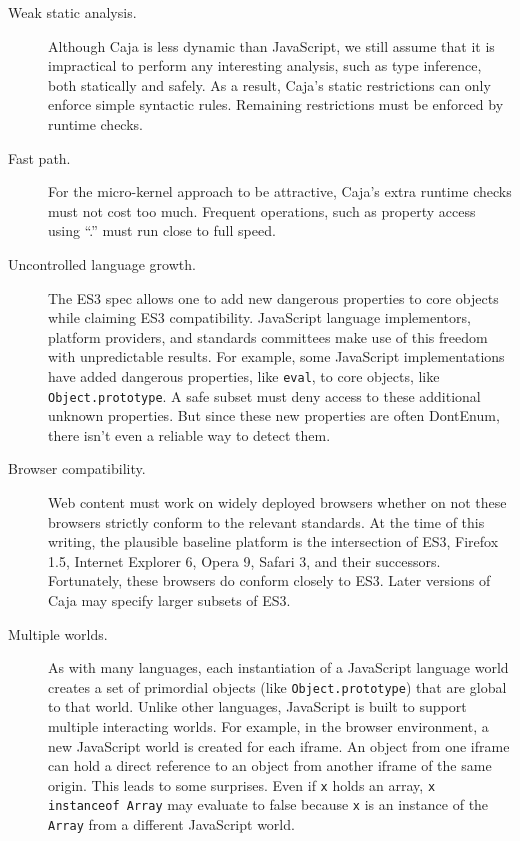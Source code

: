 \documentclass[letterpaper,twocolumn,10pt]{article}
\newcommand{\code}[1]{{\tt {#1}}}              %
\begin{document}
\begin{description}
  \item[Weak static analysis.] Although Caja is less dynamic than JavaScript, we still assume that it is impractical 
  to perform any interesting analysis, such as type inference, both statically and safely. As a result, Caja's static 
  restrictions can only enforce simple syntactic rules. Remaining restrictions must be enforced by runtime checks.
  
  \item[Fast path.] For the micro-kernel approach to be attractive, Caja's extra runtime checks must not cost too 
  much. Frequent operations, such as property access using ``.'' must run close to full speed.
  
  \item[Uncontrolled language growth.] The ES3 spec allows one to add new dangerous properties to core objects while 
  claiming ES3 compatibility. JavaScript language implementors, platform providers, and standards committees make use 
  of this freedom with unpredictable results. For example, some JavaScript implementations have added dangerous 
  properties, like \code{eval}, to core objects, like \code{Object.prototype}. A safe subset must deny access to 
  these additional unknown properties. But since these new properties are often DontEnum, there isn't even a reliable 
  way to detect them.
  
  \item[Browser compatibility.] Web content must work on widely deployed browsers whether on not these browsers 
  strictly conform to the relevant standards. At the time of this writing, the plausible baseline platform is the 
  intersection of ES3, Firefox 1.5, Internet Explorer 6, Opera 9, Safari 3, and their successors. Fortunately, these 
  browsers do conform closely to ES3. Later versions of Caja may specify larger subsets of ES3.
  
  \item[Multiple worlds.] As with many languages, each instantiation of a JavaScript language world creates a set of 
  primordial objects (like \code{Object.prototype}) that are global to that world. Unlike other languages, JavaScript 
  is built to support multiple interacting worlds. For example, in the browser environment, a new JavaScript world is 
  created for each iframe. An object from one iframe can hold a direct reference to an object from another iframe of 
  the same origin. This leads to some surprises. Even if \code{x} holds an array, \code{x instanceof Array} may 
  evaluate to false because \code{x} is an instance of the \code{Array} from a different JavaScript world.
  

\end{description}
\end{document}
